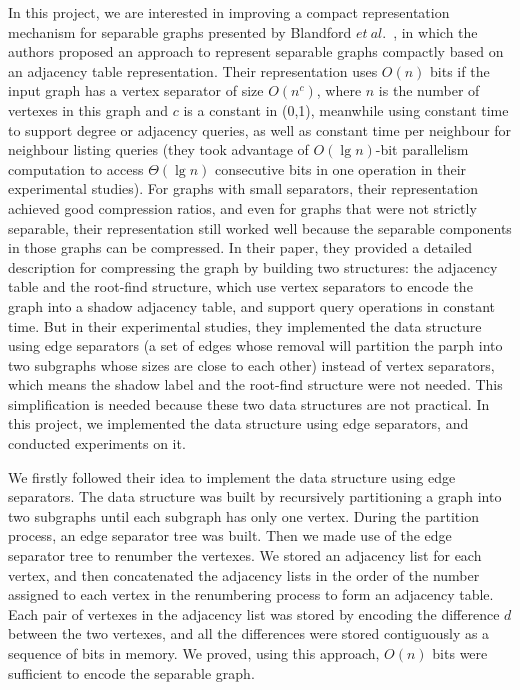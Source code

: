 \documentclass[12pt,glossary]{dalthesis}
\begin{document}
\bigskip


In this project, we are interested in improving a compact representation mechanism for separable graphs presented by Blandford $et \ al.$~\cite{compact-representation}, in which the authors proposed an approach to represent separable graphs compactly based on an adjacency table representation. Their representation uses $O(n)$ bits if the input graph has a vertex separator of size $O(n^{c})$, where $n$ is the number of vertexes in this graph and $c$ is a constant in (0,1), meanwhile using constant time to support degree or adjacency queries, as well as constant time per neighbour for neighbour listing queries (they took advantage of $O(\lg n)$-bit parallelism computation to access $\Theta(\lg n)$ consecutive bits in one operation in their experimental studies). For graphs with small separators, their representation achieved good compression ratios, and even for graphs that were not strictly separable, their representation still worked well because the separable components in those graphs can be compressed. In their paper, they provided a detailed description for compressing the graph by building two structures: the adjacency table and the root-find structure, which use vertex separators to encode the graph into a shadow adjacency table, and support query operations in constant time. But in their experimental studies, they implemented the data structure using edge separators (a set of edges whose removal will partition the parph into two subgraphs whose sizes are close to each other) instead of vertex separators, which means the shadow label and the root-find structure were not needed. This simplification is needed because these two data structures are not practical. In this project, we implemented the data structure using edge separators, and conducted experiments on it.

\bigskip
\bigskip

We firstly followed their idea to implement the data structure using edge separators. The data structure was built by recursively partitioning a graph into two subgraphs until each subgraph has only one vertex. During the partition process, an edge separator tree was built. Then we made use of the edge separator tree to renumber the vertexes. We stored an adjacency list for each vertex, and then concatenated the adjacency lists in the order of the number assigned to each vertex in the renumbering process to form an adjacency table. Each pair of vertexes in the adjacency list was stored by encoding the difference $d$ between the two vertexes, and all the differences were stored contiguously as a sequence of bits in memory. We proved, using this approach, $O(n)$ bits were sufficient to encode the separable graph. 
\end{document}
